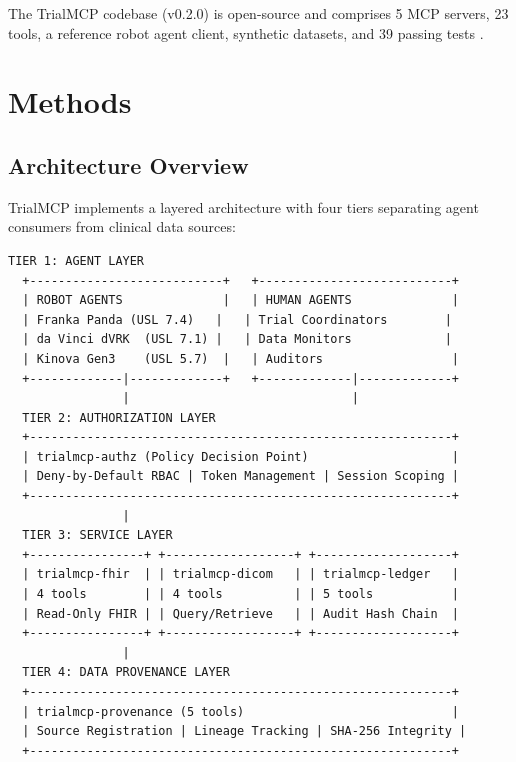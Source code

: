 \documentclass[10pt,letterpaper]{article}
\begin{document}
The TrialMCP codebase (v0.2.0) is open-source and comprises 5 MCP servers, 23 tools, a reference robot agent client, synthetic datasets, and 39 passing tests \cite{kawchak2026pai}.

\section{Methods}

\subsection{Architecture Overview}

TrialMCP implements a layered architecture with four tiers separating agent consumers from clinical data sources:

\begin{lstlisting}[title={\textbf{TrialMCP Layered Architecture}}]
  TIER 1: AGENT LAYER
  +---------------------------+   +---------------------------+
  | ROBOT AGENTS              |   | HUMAN AGENTS              |
  | Franka Panda (USL 7.4)   |   | Trial Coordinators        |
  | da Vinci dVRK  (USL 7.1) |   | Data Monitors             |
  | Kinova Gen3    (USL 5.7)  |   | Auditors                  |
  +-------------|-------------+   +-------------|-------------+
                |                               |
  TIER 2: AUTHORIZATION LAYER
  +-----------------------------------------------------------+
  | trialmcp-authz (Policy Decision Point)                    |
  | Deny-by-Default RBAC | Token Management | Session Scoping |
  +-----------------------------------------------------------+
                |
  TIER 3: SERVICE LAYER
  +----------------+ +------------------+ +-------------------+
  | trialmcp-fhir  | | trialmcp-dicom   | | trialmcp-ledger   |
  | 4 tools        | | 4 tools          | | 5 tools           |
  | Read-Only FHIR | | Query/Retrieve   | | Audit Hash Chain  |
  +----------------+ +------------------+ +-------------------+
                |
  TIER 4: DATA PROVENANCE LAYER
  +-----------------------------------------------------------+
  | trialmcp-provenance (5 tools)                             |
  | Source Registration | Lineage Tracking | SHA-256 Integrity |
  +-----------------------------------------------------------+
\end{lstlisting}
\end{document}

